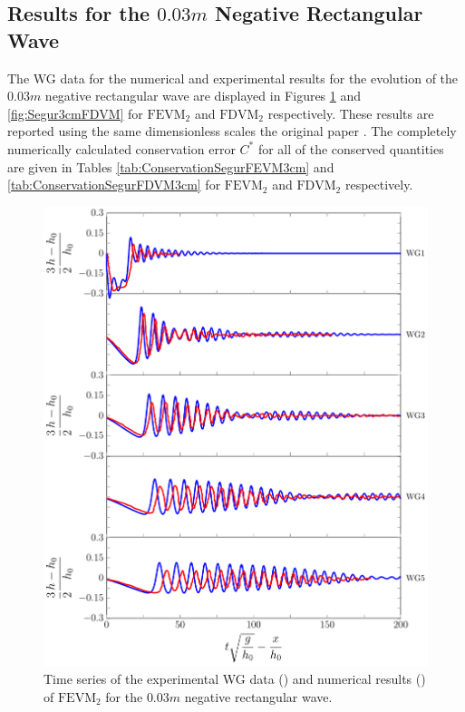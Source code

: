 \subsection{Results for the $0.03m$ Negative Rectangular Wave}
The WG data for the numerical and experimental results for the evolution of the $0.03m$ negative rectangular wave are displayed in Figures \ref{fig:Segur3cmFEVM} and \ref{fig:Segur3cmFDVM} for $\text{FEVM}_2$ and $\text{FDVM}_2$ respectively. These results are reported using the same dimensionless scales the original paper \cite{Hammack-Segur-1978-337}. The completely numerically calculated conservation error $C^*$ for all of the conserved quantities are given in Tables \ref{tab:ConservationSegurFEVM3cm} and \ref{tab:ConservationSegurFDVM3cm} for $\text{FEVM}_2$ and $\text{FDVM}_2$ respectively.
\begin{figure}
	\centering
	\includegraphics[width=\textwidth]{./chp6/figures/Experiment/Segur/LongWGsFEVM3cm.pdf}
	\caption{Time series of the experimental WG data ({\color{red}\solidrule}) and numerical results ({\color{blue}\solidrule}) of $\text{FEVM}_2$ for the $0.03m$ negative rectangular wave.}
	\label{fig:Segur3cmFEVM}
\end{figure}

